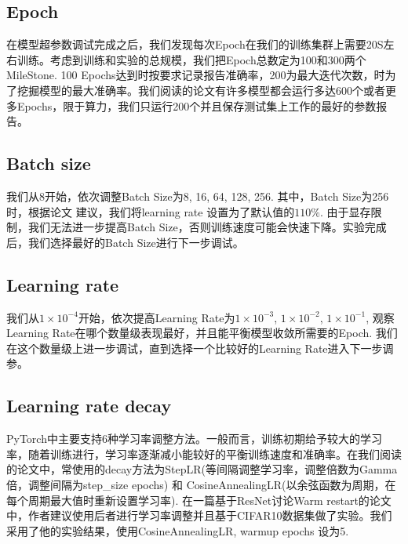 \documentclass[hyperref, UTF8, 12pt]{article}
\theoremstyle{definition}
\begin{document}
\subsection{Epoch}
在模型超参数调试完成之后，我们发现每次Epoch在我们的训练集群上需要20S左右训练。考虑到训练和实验的总规模，我们把Epoch总数定为100和300两个MileStone. 100 Epochs达到时按要求记录报告准确率，200为最大迭代次数，时为了挖掘模型的最大准确率。我们阅读的论文有许多模型都会运行多达600个或者更多Epochs，限于算力，我们只运行200个并且保存测试集上工作的最好的参数报告。

\subsection{Batch size}
我们从8开始，依次调整Batch Size为8, 16, 64, 128, 256. 其中，Batch Size为256时，根据论文\cite{he2015deep} 建议，我们将learning rate 设置为了默认值的$110\%$. 由于显存限制，我们无法进一步提高Batch Size，否则训练速度可能会快速下降。实验完成后，我们选择最好的Batch Size进行下一步调试。

\subsection{Learning rate}
我们从$1 \times 10^{-4}$开始，依次提高Learning Rate为$1 \times 10^{-3}$, $1 \times 10^{-2}$, $1 \times 10^{-1}$, 观察Learning Rate在哪个数量级表现最好，并且能平衡模型收敛所需要的Epoch. 我们在这个数量级上进一步调试，直到选择一个比较好的Learning Rate进入下一步调参。

\subsection{Learning rate decay}
PyTorch中主要支持6种学习率调整方法。一般而言，训练初期给予较大的学习率，随着训练进行，学习率逐渐减小能较好的平衡训练速度和准确率。在我们阅读的论文中，常使用的decay方法为StepLR(等间隔调整学习率，调整倍数为Gamma倍，调整间隔为step\_size epochs) 和 CosineAnnealingLR(以余弦函数为周期，在每个周期最大值时重新设置学习率). 在一篇基于ResNet讨论Warm restart的论文中\cite{loshchilov2017sgdr}，作者建议使用后者进行学习率调整并且基于CIFAR10数据集做了实验。我们采用了他的实验结果，使用CosineAnnealingLR, warmup epochs 设为5.
\end{document}
